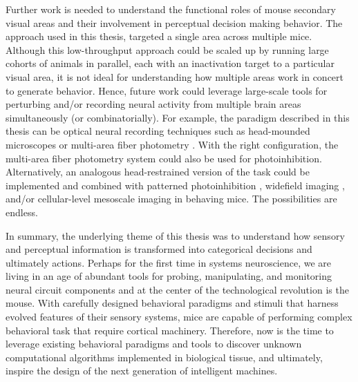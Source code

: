 Further work is needed to understand the functional roles of mouse secondary visual areas and their involvement in perceptual decision making behavior. The approach used in this thesis, targeted a single area across multiple mice. Although this low-throughput approach could be scaled up by running large cohorts of animals in parallel, each with an inactivation target to a particular visual area, it is not ideal for understanding how multiple areas work in concert to generate behavior. Hence, future work could leverage large-scale tools for perturbing and/or recording neural activity from multiple brain areas simultaneously (or combinatorially). For example, the paradigm described in this thesis can be optical neural recording techniques such as head-mounded microscopes \parencite{Ghosh2011} or multi-area fiber photometry \parencite{Kim2016}. With the right configuration, the multi-area fiber photometry system could also be used for photoinhibition. Alternatively, an analogous head-restrained version of the task \parencite{Marbach2016} could be implemented and combined with patterned photoinhibition \parencite{Dhawale2010,Guo2014a}, widefield imaging \parencite{Wekselblatt2016}, and/or cellular-level mesoscale imaging \parencite{Stirman2016a,Sofroniew2016} in behaving mice. The possibilities are endless.

In summary, the underlying theme of this thesis was to understand how sensory and perceptual information is transformed into categorical decisions and ultimately actions. Perhaps for the first time in systems neuroscience, we are living in an age of abundant tools for probing, manipulating, and monitoring neural circuit components and at the center of the technological revolution is the mouse. With carefully designed behavioral paradigms and stimuli that harness evolved features of their sensory systems, mice are capable of performing complex behavioral task that require cortical machinery. Therefore, now is the time to leverage existing behavioral paradigms and tools to discover unknown computational algorithms implemented in biological tissue, and ultimately, inspire the design of the next generation of intelligent machines.



